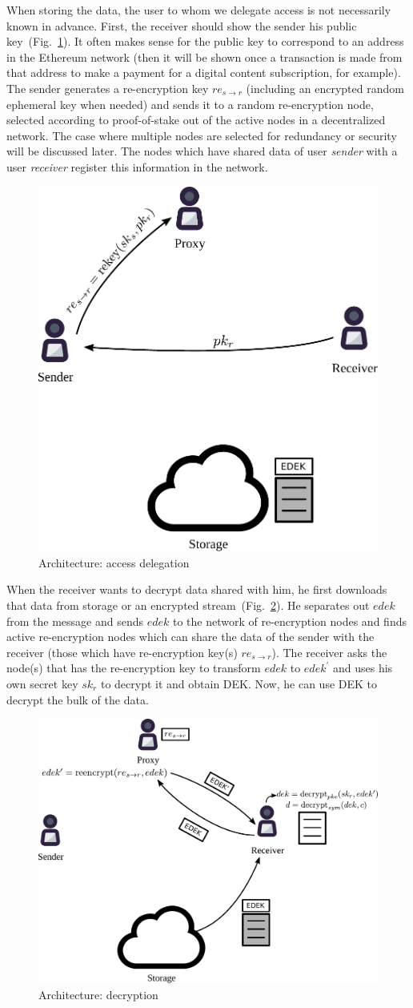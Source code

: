 \documentclass[longbibliography]{revtex4-1}
\newcommand{\figref}[1]{Fig.~\ref{#1}}
\begin{document}
When storing the data, the user to whom we delegate access is not necessarily known in advance.
First, the receiver should show the sender his public key~(\figref{fig:arch-delegate}).
It often makes sense for the public key to correspond to an address in the Ethereum network (then it will be shown once a transaction is made from that
address to make a payment for a digital content subscription, for example).
The sender generates a re-encryption key $re_{s\rightarrow r}$ (including an encrypted random ephemeral key when needed) and sends it to a random re-encryption
node, selected according to proof-of-stake out of the active nodes in a decentralized network.
The case where multiple nodes are selected for redundancy or security will be discussed later.
The nodes which have shared data of user \emph{sender} with a user \emph{receiver} register this information in the network.
\begin{figure}
\centering
    \includegraphics[width=0.4\columnwidth]{pdf/delegate.pdf}
    \caption{Architecture: access delegation}
    \label{fig:arch-delegate}
\end{figure}

When the receiver wants to decrypt data shared with him, he first downloads that data from storage or an encrypted stream~(\figref{fig:arch-decrypt}).
He separates out $edek$ from the message and sends $edek$ to the network of re-encryption nodes and finds active re-encryption nodes which can share the data
of the sender with the receiver (those which have re-encryption key(s) $re_{s\rightarrow r}$).
The receiver asks the node(s) that has the re-encryption key to transform $edek$ to $edek^{\prime}$ and uses his own secret key $sk_r$ to decrypt it and
obtain DEK.
Now, he can use DEK to decrypt the bulk of the data.
\begin{figure}
\centering
    \includegraphics[width=0.6\columnwidth]{pdf/decrypt.pdf}
    \caption{Architecture: decryption}
    \label{fig:arch-decrypt}
\end{figure}
\end{document}
